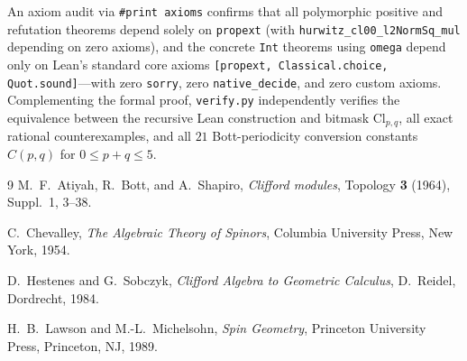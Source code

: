 \documentclass[11pt]{article}
\theoremstyle{definition}
\newcommand{\Cl}{\mathrm{Cl}}
\begin{document}
An axiom audit via \texttt{\#print axioms} confirms that all polymorphic positive and refutation theorems depend solely on \texttt{propext} (with \texttt{hurwitz\_cl00\_l2NormSq\_mul} depending on zero axioms), and the concrete \texttt{Int} theorems using \texttt{omega} depend only on Lean's standard core axioms \texttt{[propext, Classical.choice, Quot.sound]}---with zero \texttt{sorry}, zero \texttt{native\_decide}, and zero custom axioms. Complementing the formal proof, \texttt{verify.py} independently verifies the equivalence between the recursive Lean construction and bitmask $\Cl_{p,q}$, all exact rational counterexamples, and all $21$ Bott-periodicity conversion constants $C(p,q)$ for $0\le p+q\le 5$.

\begin{thebibliography}{9}
M.~F.~Atiyah, R.~Bott, and A.~Shapiro, \emph{Clifford modules}, Topology \textbf{3} (1964), Suppl.~1, 3--38.

C.~Chevalley, \emph{The Algebraic Theory of Spinors}, Columbia University Press, New York, 1954.

D.~Hestenes and G.~Sobczyk, \emph{Clifford Algebra to Geometric Calculus}, D.~Reidel, Dordrecht, 1984.

H.~B.~Lawson and M.-L.~Michelsohn, \emph{Spin Geometry}, Princeton University Press, Princeton, NJ, 1989.
\end{thebibliography}
\end{document}
